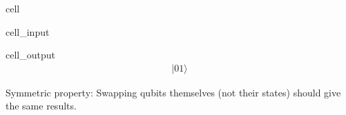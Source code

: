 \documentclass[letterpaper,10pt,english]{jupyterBook}
\begin{document}
\begin{sphinxuseclass}{cell}\begin{sphinxVerbatimInput}

\begin{sphinxuseclass}{cell_input}
\begin{sphinxVerbatim}[commandchars=\\\{\}]
\end{sphinxVerbatim}

\end{sphinxuseclass}\end{sphinxVerbatimInput}
\begin{sphinxVerbatimOutput}

\begin{sphinxuseclass}{cell_output}\begin{equation*}
\begin{split} |01\rangle\end{split}
\end{equation*}
\end{sphinxuseclass}\end{sphinxVerbatimOutput}

\end{sphinxuseclass}
\sphinxAtStartPar
Symmetric property: Swapping qubits themselves (not their states) should give the same results.
\end{document}
